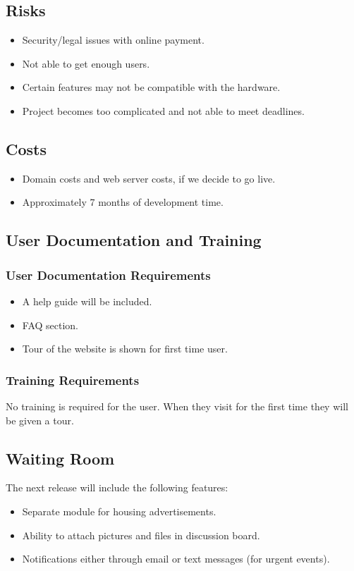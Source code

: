 \documentclass[12pt]{article}
\begin{document}
{\subsection{Risks}
\begin{itemize}
  \item Security/legal issues with online payment.
  \item Not able to get enough users.
  \item Certain features may not be compatible with the hardware.
  \item Project becomes too complicated and not able to meet deadlines.
\end{itemize}
\subsection{Costs}
\begin{itemize}
  \item Domain costs and web server costs, if we decide to go live.
  \item Approximately 7 months of development time.
\end{itemize}
\subsection{User Documentation and Training}
\subsubsection{User Documentation Requirements}
\begin{itemize}
  \item A help guide will be included.
  \item FAQ section.
  \item Tour of the website is shown for first time user.
\end{itemize}
\subsubsection{Training Requirements}
No training is required for the user. When they visit for the first time they 
will be given a tour. 
\subsection{Waiting Room}
The next release will include the following features:
\begin{itemize}
	\item Separate module for housing advertisements.
	\item Ability to attach pictures and files in discussion board.
	\item Notifications either through email or text messages (for urgent events).
\end{itemize}
}
\end{document}

